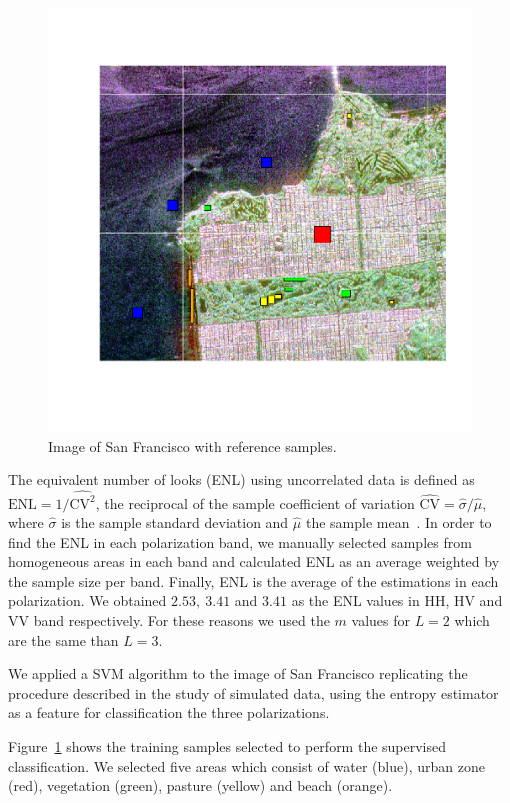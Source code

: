 \documentclass[journal]{IEEEtran}
\begin{document}
\begin{figure}[hbt]
    \centering
	\includegraphics[width=0.9\linewidth]{../../../Figures/CISS2021/muestras_entrenamiento_color2.pdf}
	\caption{Image of San Francisco with reference samples.}
	\label{TrainingSamples}
\end{figure}    

The equivalent number of looks (ENL) using uncorrelated data is defined as
$\text{ENL}={1}/{\widehat{\text{CV}^2}}$, the reciprocal of the sample coefficient of variation $\widehat{\text{CV}}={\widehat{\sigma}}/{\widehat\mu}$, where $\widehat{\sigma}$ is the sample standard deviation and $\widehat\mu$ the sample mean~\cite{Anfinsen2009}. In order to find the ENL in each polarization band, we manually selected samples from homogeneous areas in each band and calculated ENL as an average weighted by the sample size per band. Finally, ENL is the average of the estimations in each polarization. We obtained $2.53, \ 3.41$ and $3.41$ as the ENL values in HH, HV and VV band respectively. For these reasons we used the $m$ values for $L=2$ which are the same than $L=3$. 

We applied a SVM algorithm to the image of San Francisco replicating the procedure described in the study of simulated data, using the entropy estimator as a feature for classification the three polarizations.

Figure~\ref{TrainingSamples} shows the training samples selected to perform the supervised classification. We selected five areas which consist of water (blue), urban zone (red), vegetation (green), pasture (yellow) and beach (orange). 
\end{document}
